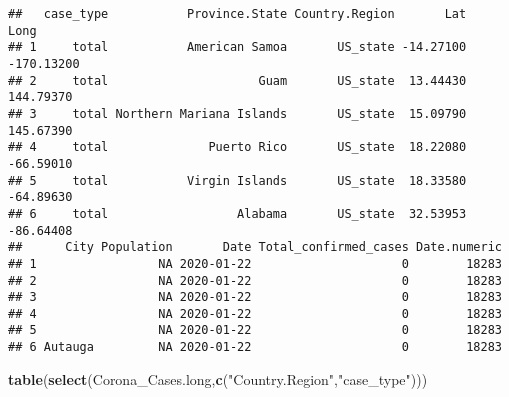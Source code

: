 \documentclass[]{article}
\newenvironment{Shaded}{\begin{snugshade}}{\end{snugshade}}
\newcommand{\KeywordTok}[1]{\textcolor[rgb]{0.13,0.29,0.53}{\textbf{{#1}}}}
\newcommand{\StringTok}[1]{\textcolor[rgb]{0.31,0.60,0.02}{{#1}}}
\newcommand{\NormalTok}[1]{{#1}}
\begin{document}
\begin{verbatim}
##   case_type           Province.State Country.Region       Lat       Long
## 1     total           American Samoa       US_state -14.27100 -170.13200
## 2     total                     Guam       US_state  13.44430  144.79370
## 3     total Northern Mariana Islands       US_state  15.09790  145.67390
## 4     total              Puerto Rico       US_state  18.22080  -66.59010
## 5     total           Virgin Islands       US_state  18.33580  -64.89630
## 6     total                  Alabama       US_state  32.53953  -86.64408
##      City Population       Date Total_confirmed_cases Date.numeric
## 1                 NA 2020-01-22                     0        18283
## 2                 NA 2020-01-22                     0        18283
## 3                 NA 2020-01-22                     0        18283
## 4                 NA 2020-01-22                     0        18283
## 5                 NA 2020-01-22                     0        18283
## 6 Autauga         NA 2020-01-22                     0        18283
\end{verbatim}

\begin{Shaded}
\begin{Highlighting}[]
\KeywordTok{table}\NormalTok{(}\KeywordTok{select}\NormalTok{(Corona_Cases.long,}\KeywordTok{c}\NormalTok{(}\StringTok{"Country.Region"}\NormalTok{,}\StringTok{"case_type"}\NormalTok{)))}
\end{Highlighting}
\end{Shaded}
\end{document}

